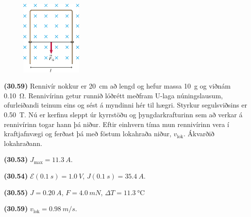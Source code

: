 \begin{enumerate}[label = \textbf{(\alph*)}]
\begin{minipage}{\linewidth}
\end{minipage}

\vspace{0.3cm}



\begin{minipage}{\linewidth}
\begin{figure}
\vspace{-1.25cm}
\includegraphics[width = 1.2in]{figures/rk3059.pdf}
\end{figure}

\item[\textbf{(30.59)}] Rennivír nokkur er \SI{20}{cm} að lengd og hefur massa \SI{10}{g} og viðnám \SI{0.10}{\ohm}. Rennivírinn getur runnið lóðrétt meðfram U-laga núningslausum, ofurleiðandi teinum eins og sést á myndinni hér til hægri. Styrkur segulsviðsins er \SI{0.50}{T}. Nú er kerfinu sleppt úr kyrrstöðu og þyngdarkrafturinn sem að verkar á rennivírinn togar hann þá niður. Eftir einhvern tíma mun rennivírinn vera í kraftjafnvægi og ferðast þá með föstum lokahraða niður, $v_{\text{lok}}$. Ákvarðið lokahraðann.

\end{minipage}

\end{enumerate}

\vspace{1cm}

\begin{tcolorbox}
\begin{enumerate*}[label = ]
  \item \textbf{(30.53)} $J_{\text{max}} = \SI{11.3}{A}$.
  \item \textbf{(30.54)} $\mathcal{E}(\SI{0.1}{s}) = \SI{1.0}{V}$, $J(\SI{0.1}{s}) = \SI{35.4}{A}$.
  \item \textbf{(30.55)} $J = \SI{0.20}{A}$, $F = \SI{4.0}{mN}$, $\Delta T = \SI{11.3}{\celsius}$
  \item \textbf{(30.59)} $v_{\text{lok}} = \SI{0.98}{m/s}$.
\end{enumerate*}
\end{tcolorbox}

